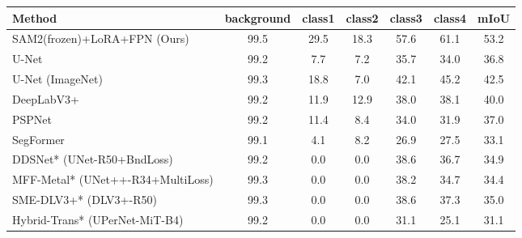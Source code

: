 \begin{tabular}{lcccccc}
\toprule
Method & background & class1 & class2 & class3 & class4 & mIoU \\
\midrule
SAM2(frozen)+LoRA+FPN (Ours) & 99.5 & 29.5 & 18.3 & 57.6 & 61.1 & 53.2 \\
U-Net & 99.2 & 7.7 & 7.2 & 35.7 & 34.0 & 36.8 \\
U-Net (ImageNet) & 99.3 & 18.8 & 7.0 & 42.1 & 45.2 & 42.5 \\
DeepLabV3+ & 99.2 & 11.9 & 12.9 & 38.0 & 38.1 & 40.0 \\
PSPNet & 99.2 & 11.4 & 8.4 & 34.0 & 31.9 & 37.0 \\
SegFormer & 99.1 & 4.1 & 8.2 & 26.9 & 27.5 & 33.1 \\
DDSNet* (UNet-R50+BndLoss) & 99.2 & 0.0 & 0.0 & 38.6 & 36.7 & 34.9 \\
MFF-Metal* (UNet++-R34+MultiLoss) & 99.3 & 0.0 & 0.0 & 38.2 & 34.7 & 34.4 \\
SME-DLV3+* (DLV3+-R50) & 99.3 & 0.0 & 0.0 & 38.6 & 37.3 & 35.0 \\
Hybrid-Trans* (UPerNet-MiT-B4) & 99.2 & 0.0 & 0.0 & 31.1 & 25.1 & 31.1 \\
\bottomrule
\end{tabular}
